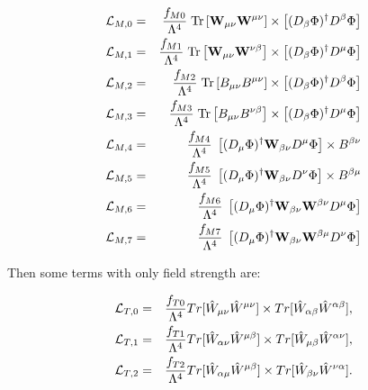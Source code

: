 \begin{eqnarray}
{\cal L}_{M,0} &=& \dfrac{f_{M0}}{\Lambda^{4}}\;\mbox{Tr}\left[ \mathbf{W}_{\mu\nu} \mathbf{W}^{\mu\nu} \right] \times \left[  (D_{\beta}\Phi)^{\dagger} D^{\beta}\Phi \right] \nonumber \\
{\cal L}_{M,1} &=& \dfrac{f_{M1}}{\Lambda^{4}}\;\mbox{Tr}\left[ \mathbf{W}_{\mu\nu} \mathbf{W}^{\nu\beta}\right] \times \left[  (D_{\beta}\Phi)^{\dagger} D^{\mu}\Phi \right] \nonumber \\
{\cal L}_{M,2} &=& \dfrac{f_{M2}}{\Lambda^{4}}\;\mbox{Tr}\left[ B_{\mu\nu} B^{\mu\nu}\right] \times \left[  (D_{\beta}\Phi)^{\dagger} D^{\beta}\Phi \right] \nonumber \\
{\cal L}_{M,3} &=& \dfrac{f_{M3}}{\Lambda^{4}}\;\mbox{Tr}\left[ B_{\mu\nu} B^{\nu\beta}\right] \times \left[  (D_{\beta}\Phi)^{\dagger} D^{\mu}\Phi \right] \nonumber \\
{\cal L}_{M,4} &=& \dfrac{f_{M4}}{\Lambda^{4}}\;\left[  (D_{\mu}\Phi)^{\dagger} \mathbf{W}_{\beta\nu}  D^{\mu}\Phi \right] \times B^{\beta\nu} \nonumber \\
{\cal L}_{M,5} &=& \dfrac{f_{M5}}{\Lambda^{4}}\;\left[  (D_{\mu}\Phi)^{\dagger} \mathbf{W}_{\beta\nu}  D^{\nu}\Phi \right] \times B^{\beta\mu} \nonumber \\
{\cal L}_{M,6} &=& \dfrac{f_{M6}}{\Lambda^{4}}\;\left[  (D_{\mu}\Phi)^{\dagger} \mathbf{W}_{\beta\nu} \mathbf{W}^{\beta\nu} D^{\mu}\Phi \right] \nonumber \\
{\cal L}_{M,7} &=& \dfrac{f_{M7}}{\Lambda^{4}}\;\left[  (D_{\mu}\Phi)^{\dagger} \mathbf{W}_{\beta\nu} \mathbf{W}^{\beta\mu} D^{\nu}\Phi \right] \nonumber \\
\label{dim8:lm}
\end{eqnarray}

Then some terms with only field strength are:

\begin{center}
\begin{eqnarray}\label{operator:LT}
{\cal L}_{T,0} &=& \dfrac{f_{T0}}{\Lambda^{4}} Tr[\hat{W}_{\mu \nu} \hat{W}^{\mu \nu}] \times Tr[\hat{W}_{\alpha \beta} \hat{W}^{\alpha \beta}] , \nonumber\\
{\cal L}_{T,1} &=& \dfrac{f_{T1}}{\Lambda^{4}} Tr[\hat{W}_{\alpha \nu} \hat{W}^{\mu \beta}] \times Tr[\hat{W}_{\mu \beta} \hat{W}^{\alpha \nu}] , \nonumber\\
{\cal L}_{T,2} &=& \dfrac{f_{T2}}{\Lambda^{4}} Tr[\hat{W}_{\alpha \mu} \hat{W}^{\mu \beta}] \times Tr[\hat{W}_{\beta \nu} \hat{W}^{\nu \alpha}] . \nonumber\\
\end{eqnarray}
\end{center}

